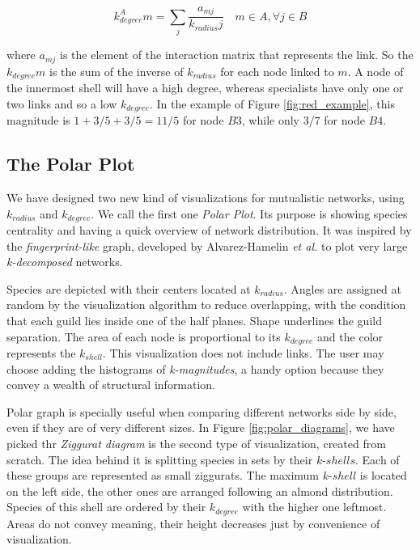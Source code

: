 \documentclass[12pt]{article}
\begin{document}
\begin{equation}
\displaystyle
k^A_{degree}m = \sum\limits_{j} \frac{a_{mj} }{k_{radius}j}  \quad   m \in A, \forall j \in B
\label{kdegree}
\end{equation}

\noindent where $a_{mj}$ is the element of the interaction matrix that represents the link. So the $k_{degree}m$ is the sum of the inverse of $k_{radius}$ for each node linked to $m$. A node of the innermost shell will have a high degree, whereas specialists have only one or two links and so a low $k_{degree}$. In the example of Figure \ref{fig:red_example}, this magnitude is $1+3/5+3/5 = 11/5$ for node $B3$, while only $3/7$ for node $B4$. 


\subsection*{The Polar Plot}
\label{visualizations}

We have designed two new kind of  visualizations for mutualistic networks, using $k_{radius}$ and $k_{degree}$. We call the first one \textit{Polar Plot}. Its purpose is showing species centrality and having a quick overview of network distribution. It was inspired by the \textit{fingerprint-like} graph, developed by Alvarez-Hamelin \textit{et al.} \cite{alvarez:2005k} to plot very large \textit{k-decomposed} networks.

Species are depicted with their centers located at $k_{radius}$. Angles are assigned at random by the visualization algorithm to reduce overlapping, with the condition that each guild lies inside one of the half planes. Shape underlines the guild separation. The area of each node is proportional to its $k_{degree}$ and the color represents the $k_{shell}$. This visualization does not include links. The user may choose adding the histograms of \textit{k-magnitudes}, a handy option because they convey a wealth of structural information.


Polar graph is specially useful when comparing different networks side by side, even if they are of very different sizes. In Figure \ref{fig:polar_diagrams}, we have picked thr
\textit{Ziggurat diagram} is the second type of visualization, created from scratch. The idea behind it is splitting species in sets by their $k$-$shells$. Each of these groups are represented as small ziggurats. The maximum $k$-$shell$ is located on the left side, the other ones are arranged following an almond distribution. Species of this shell are ordered by their $k_{degree}$ with the higher one leftmost. Areas do not convey meaning, their height decreases just by convenience of visualization. 
\end{document}
